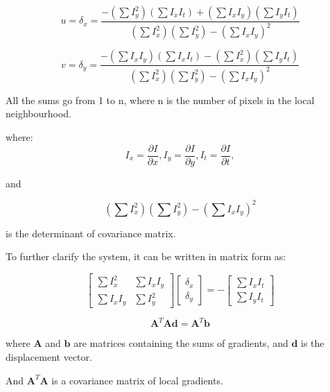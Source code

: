 \documentclass{article}
\begin{document}
\begin{multicols}{2}
	\[
		u = \delta_x = \frac{-\left( \sum I_y^2 \right) \left( \sum I_x I_t \right) + \left( \sum I_x I_y \right)\left( \sum I_y I_t \right)}{\left( \sum I_x^2 \right) \left( \sum I_y^2 \right) - \left( \sum I_x I_y \right)^2}
	\]

	\[
		v = \delta_y = \frac{-\left( \sum I_x I_y \right) \left( \sum I_x I_t \right) - \left( \sum I_x^2 \right)\left( \sum I_y I_t \right)}{\left( \sum I_x^2 \right) \left( \sum I_y^2 \right) - \left( \sum I_x I_y \right)^2}
	\]

	All the sums go from 1 to n, where n is the number of pixels in the local neighbourhood.

	where:
	\[
		I_x = \frac{\partial I}{\partial x},
		I_y = \frac{\partial I}{\partial y},
		I_t = \frac{\partial I}{\partial t},
	\]

	and

	\[
		\left( \sum I_x^2 \right) \left( \sum I_y^2 \right) - \left( \sum I_x I_y \right)^2
	\]

	is the determinant of covariance matrix.

	To further clarify the system, it can be written in matrix form as:

	\[
		\left[ \begin{array}{cc}
				\sum I_x^2   & \sum I_x I_y \\
				\sum I_x I_y & \sum I_y^2
			\end{array} \right]
		\left[ \begin{array}{c}
				\delta_x \\
				\delta_y
			\end{array} \right]
		=
		-\left[ \begin{array}{c}
				\sum I_x I_t \\
				\sum I_y I_t
			\end{array} \right]
	\]

	\[
		\mathbf{A}^T \mathbf{A} \mathbf{d} = \mathbf{A}^T \mathbf{b}
	\]

	where \(\mathbf{A}\) and \(\mathbf{b}\) are matrices containing the sums of gradients, and \(\mathbf{d}\) is the displacement vector.

	And \(\mathbf{A}^T \mathbf{A} \) is a covariance matrix of local gradients.


\end{multicols}
\end{document}
